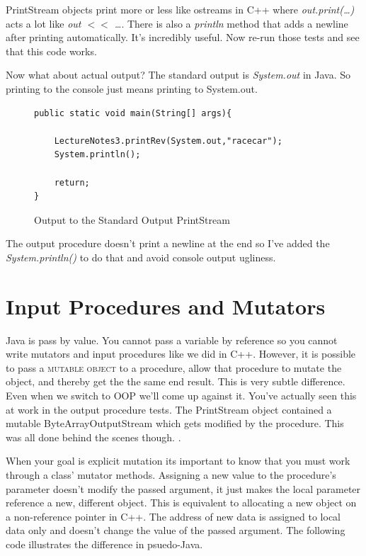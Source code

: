 \documentclass[]{tufte-handout}
\begin{document}
PrintStream objects print more or less like ostreams in C++ where \textit{out.print(\ldots)} acts a lot like \textit{out $<<$ \ldots}. There is also a \textit{println} method that adds a newline after printing automatically. It's incredibly useful. Now re-run those tests and see that this code works.

Now what about actual output? The standard output is \textit{System.out} in Java. So printing to the console just means printing to System.out.

\begin{figure}
\begin{lstlisting}
public static void main(String[] args){

	LectureNotes3.printRev(System.out,"racecar");
	System.println();

	return;
}
\end{lstlisting}
\label{fig:consoleOutput}
\caption{Output to the Standard Output PrintStream}
\end{figure}

The output procedure doesn't print a newline at the end so I've added the \textit{	System.println() } to do that and avoid console output ugliness.

\section{Input Procedures and Mutators}

Java is pass by value. You cannot pass a variable by reference so you cannot write mutators and input procedures like we did in C++. However, it is possible to pass a \textsc{mutable object} to a procedure, allow that procedure to mutate the object, and thereby get the the same end result. This is very subtle difference. Even when we switch to OOP we'll come up against it. You've actually seen this at work in the output procedure tests. The PrintStream object contained a mutable ByteArrayOutputStream which gets modified by the procedure. This was all done behind the scenes though.
.

When your goal is explicit mutation its important to know that you must work through a class' mutator methods. Assigning a new value to the procedure's parameter doesn't modify the passed argument, it just makes the local parameter reference a new, different object. This is equivalent to allocating a new object on a non-reference pointer in C++. The address of new data is assigned to local data only and doesn't change the value of the passed argument. The following code illustrates the difference in psuedo-Java.
\end{document}
